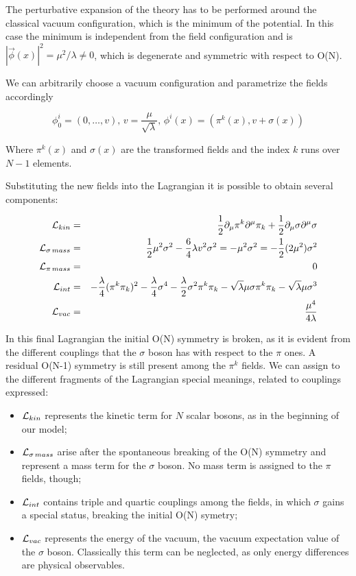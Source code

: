 The perturbative expansion of the theory has to be performed around the classical vacuum configuration, which is the minimum of the potential. In this case the minimum is independent from the field configuration and is $|\vec{\phi}(x)|^2 = \mu^2 / \lambda \neq 0$, which is degenerate and symmetric with respect to O(N).

We can arbitrarily choose a vacuum configuration and parametrize the fields accordingly

\begin{equation}
\phi_0^i = (0, \ldots, v), \, v= \dfrac{\mu}{\sqrt{\lambda}}, \, \phi^i(x) = (\pi^k(x), v + \sigma(x))
\end{equation}

Where $\pi^k(x)$ and $\sigma(x)$ are the transformed fields and the index $k$ runs over $N-1$ elements. 

Substituting the new fields into the Lagrangian it is possible to obtain several components:

\begin{eqnarray}
\mathcal{L}_{kin} &=& \dfrac{1}{2} \partial_\mu \pi^k \partial^\mu \pi_k + \dfrac{1}{2}  \partial_\mu \sigma \partial^\mu \sigma \nonumber \\
\mathcal{L}_{\sigma \, mass} &=& \dfrac{1}{2} \mu^2 \sigma^2 - \dfrac{6}{4} \lambda v^2 \sigma^2 = - \mu^2 \sigma^2 = -\dfrac{1}{2} (2\mu^2) \sigma^2 \nonumber \\
\mathcal{L}_{\pi \, mass} &=& 0 \nonumber \\
\mathcal{L}_{int} &=& - \dfrac{\lambda}{4} (\pi^k\pi_k)^2 - \dfrac{\lambda}{4} \sigma^4 - \dfrac{\lambda}{2} \sigma^2 \pi^k \pi_k - \sqrt{\lambda} \mu \sigma \pi^k \pi_k - \sqrt{\lambda} \mu \sigma^3 \nonumber \\
\mathcal{L}_{vac} &=& \dfrac{\mu^4}{4\lambda} 
\end{eqnarray}

In this final Lagrangian the initial O(N) symmetry is broken, as it is evident from the different couplings that the $\sigma$ boson has with respect to the $\pi$ ones. A residual O(N-1) symmetry is still present among the $\pi^k$ fields.
We can assign to the different fragments of the Lagrangian special meanings, related to couplings expressed:
\begin{itemize}
\item $\mathcal{L}_{kin}$ represents the kinetic term for $N$ scalar bosons, as in the beginning of our model;
\item $\mathcal{L}_{\sigma \, mass}$ arise after the spontaneous breaking of the O(N) symmetry and represent a mass term for the $\sigma$ boson. No mass term is assigned to the $\pi$ fields, though;
\item $\mathcal{L}_{int}$ contains triple and quartic couplings among the fields, in which $\sigma$ gains a special status, breaking the initial O(N) symetry;
\item $\mathcal{L}_{vac}$ represents the energy of the vacuum, the vacuum expectation value of the $\sigma$ boson. Classically this term can be neglected, as only energy differences are physical observables.
\end{itemize}

